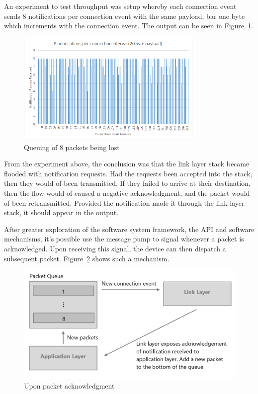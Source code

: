 \documentclass[]{article}
\begin{document}
An experiment to test throughput was setup whereby each connection event sends 8 notifications per connection event with the same payload, bar one byte which increments with the connection event. The output can be seen in Figure~\ref{fig:8pckt}.

\begin{figure}[H]
	\begin{center}
		\includegraphics[width = 0.8\textwidth]{8pckt}
	\end{center}
	\caption{Queuing of 8 packets being lost}
	\label{fig:8pckt}
\end{figure}

From the experiment above, the conclusion was that the link layer stack became flooded with notification requests. Had the requests been accepted into the stack, then they would of been transmitted. If they failed to arrive at their destination, then the flow would of caused a negative acknowledgment, and the packet would of been retransmitted. Provided the notification made it through the link layer stack, it should appear in the output. 

After greater exploration of the software system framework, the \ac{API} and software mechanisms, it's possible use the message pump to signal whenever a packet is acknowledged. Upon receiving this signal, the device can then dispatch a subsequent packet. Figure~\ref{fig:lsrad} shows such a mechanism. 

\begin{figure}[!h]
	\begin{center}
		\includegraphics[width = \textwidth]{lsrad}
	\end{center}
	\caption{Upon packet acknowledgment }
	\label{fig:lsrad}
\end{figure}
\end{document}

